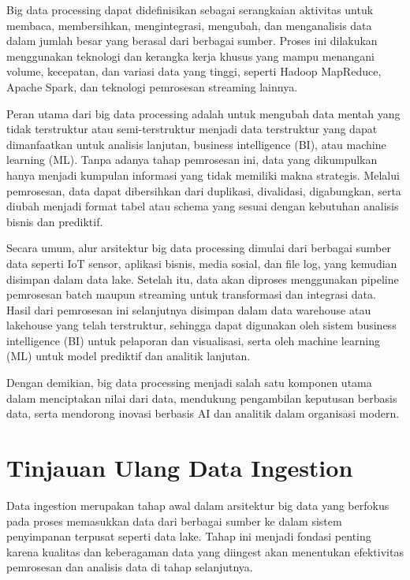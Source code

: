 Big data processing dapat didefinisikan sebagai serangkaian aktivitas untuk membaca, membersihkan, mengintegrasi, mengubah, dan menganalisis data dalam jumlah besar yang berasal dari berbagai sumber. Proses ini dilakukan menggunakan teknologi dan kerangka kerja khusus yang mampu menangani volume, kecepatan, dan variasi data yang tinggi, seperti Hadoop MapReduce, Apache Spark, dan teknologi pemrosesan streaming lainnya.

Peran utama dari big data processing adalah untuk mengubah data mentah yang tidak terstruktur atau semi-terstruktur menjadi data terstruktur yang dapat dimanfaatkan untuk analisis lanjutan, business intelligence (BI), atau machine learning (ML). Tanpa adanya tahap pemrosesan ini, data yang dikumpulkan hanya menjadi kumpulan informasi yang tidak memiliki makna strategis. Melalui pemrosesan, data dapat dibersihkan dari duplikasi, divalidasi, digabungkan, serta diubah menjadi format tabel atau schema yang sesuai dengan kebutuhan analisis bisnis dan prediktif.

Secara umum, alur arsitektur big data processing dimulai dari berbagai sumber data seperti IoT sensor, aplikasi bisnis, media sosial, dan file log, yang kemudian disimpan dalam data lake. Setelah itu, data akan diproses menggunakan pipeline pemrosesan batch maupun streaming untuk transformasi dan integrasi data. Hasil dari pemrosesan ini selanjutnya disimpan dalam data warehouse atau lakehouse yang telah terstruktur, sehingga dapat digunakan oleh sistem business intelligence (BI) untuk pelaporan dan visualisasi, serta oleh machine learning (ML) untuk model prediktif dan analitik lanjutan.

Dengan demikian, big data processing menjadi salah satu komponen utama dalam menciptakan nilai dari data, mendukung pengambilan keputusan berbasis data, serta mendorong inovasi berbasis AI dan analitik dalam organisasi modern.

\section{Tinjauan Ulang Data Ingestion}

Data ingestion merupakan tahap awal dalam arsitektur big data yang berfokus pada proses memasukkan data dari berbagai sumber ke dalam sistem penyimpanan terpusat seperti data lake. Tahap ini menjadi fondasi penting karena kualitas dan keberagaman data yang diingest akan menentukan efektivitas pemrosesan dan analisis data di tahap selanjutnya.

